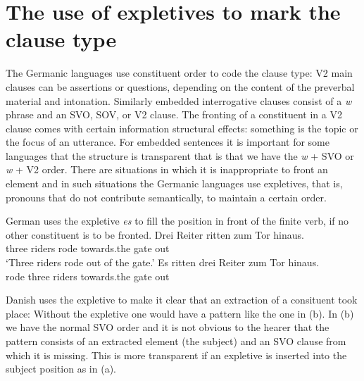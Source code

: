 \section{The use of expletives to mark the clause type}

The Germanic languages use constituent order to code the clause type: V2 main clauses can be
assertions or questions, depending on the content of the preverbal material and
intonation. Similarly embedded interrogative clauses consist of a \emph{w} phrase and an SVO, SOV,
or V2 clause. The fronting of a constituent in a V2 clause comes with certain information structural
effects: something is the topic or the focus of an utterance. For embedded sentences it is important
for some languages that the structure is transparent that is that we have the \emph{w} + SVO or
\emph{w} + V2 order. There are situations in which it is inappropriate to front an element and in
such situations the Germanic languages use expletives, that is, pronouns that do not contribute
semantically, to maintain a certain order.

German uses the expletive \emph{es} to fill the position in front of the finite verb, if no other
constituent is to be fronted.
\eal
\ex 
\gll Drei Reiter ritten zum Tor hinaus.\\
     three riders rode  towards.the gate out\\\german
\glt `Three riders rode out of the gate.'
\ex 
\gll Es ritten drei Reiter zum Tor hinaus.\\
     \expl{} rode   three riders towards.the gate out\\
\zl

Danish uses the expletive to make it clear that an extraction of a consituent took place:
\eal
{}
\zl
Without the expletive one would have a pattern like the one in (b). In (b) we have the
normal SVO order and it is not obvious to the hearer that the pattern consists of an extracted
element (the subject) and an SVO clause from which it is missing. This is more transparent if an
expletive is inserted into the subject position as in (a).

